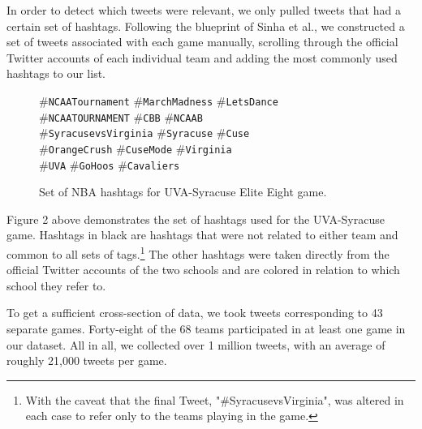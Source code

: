 \documentclass[12pt]{article}
\begin{document}
\begin{doublespacing}
In order to detect which tweets were relevant, we only pulled tweets that had a certain set of hashtags. Following the blueprint of Sinha et al., we constructed a set of tweets associated with each game manually, scrolling through the official Twitter accounts of each individual team and adding the most commonly used hashtags to our list. 
\vspace{1cm}
\begin{figure} [H]
    \begin{center}
    \#\texttt{NCAATournament} \#\texttt{MarchMadness} \#\texttt{LetsDance} \\ 
    \#\texttt{NCAATOURNAMENT} \#\texttt{CBB} \#\texttt{NCAAB} \\ 
    \#\texttt{SyracusevsVirginia} \textcolor{cuse}{\#\texttt{Syracuse}} \textcolor{cuse}{\#\texttt{Cuse}} \\ 
    \textcolor{cuse}{\#\texttt{OrangeCrush}} \textcolor{cuse}{\#\texttt{CuseMode}} \textcolor{uva}{\#\texttt{Virginia}} \\ 
    \textcolor{uva}{\#\texttt{UVA}} \textcolor{uva}{\#\texttt{GoHoos}} \textcolor{uva}{\#\texttt{Cavaliers}} \\
    \caption{Set of NBA hashtags for UVA-Syracuse Elite Eight game.}
    \end{center}
\end{figure}

Figure 2 above demonstrates the set of hashtags used for the UVA-Syracuse game. Hashtags in black are hashtags that were not related to either team and common to all sets of tags.\footnote{With the caveat that the final Tweet, "\#SyracusevsVirginia", was altered in each case to refer only to the teams playing in the game.} The other hashtags were taken directly from the official Twitter accounts of the two schools and are colored in relation to which school they refer to. 

To get a sufficient cross-section of data, we took tweets corresponding to 43 separate games. Forty-eight of the 68 teams participated in at least one game in our dataset. All in all, we collected over 1 million tweets, with an average of roughly 21,000 tweets per game. 


\end{doublespacing}
\end{document}
